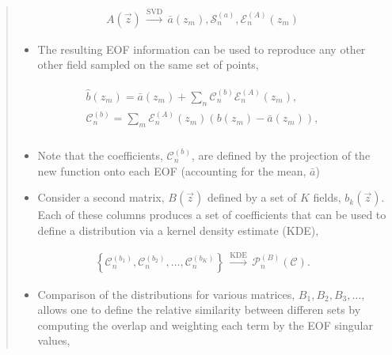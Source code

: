 \documentclass[letterpaper,10pt,english]{sphinxmanual}
\begin{document}
\begin{itemize}
\begin{quote}
\begin{itemize}
\end{itemize}
\begin{equation*}
\begin{split}A \left( \vec{z} \right)
\, \xrightarrow{\text{SVD}} \,
\bar{a} \left( z_m \right), \mathcal{S}_n^{(a)}, \mathcal{E}_n^{(A)} \left( z_m \right)\end{split}
\end{equation*}\begin{itemize}
\item {} 
\sphinxAtStartPar
The resulting EOF information can be used to reproduce any other other field sampled on the same set of points,

\end{itemize}
\begin{align*}\!\begin{aligned}
\hat{b} \left( z_m \right) = \bar{a} \left( z_m \right) + \sum_n{ \mathcal{C}_n^{(b)} \mathcal{E}_n^{(A)} \left( z_m \right)},\\
\mathcal{C}_n^{(b)} = \sum_m{\mathcal{E}_n^{(A)} \left( z_m \right) \left( b \left( z_m \right) - \bar{a} \left( z_m \right) \right)},\\
\end{aligned}\end{align*}\begin{itemize}
\item {} 
\sphinxAtStartPar
Note that the coefficients, \(\mathcal{C}_n^{(b)}\), are defined by the projection of the new function onto each EOF (accounting for the mean, \(\bar{a}\))

\item {} 
\sphinxAtStartPar
Consider a second matrix, \(B\left( \vec{z} \right)\) defined by a set of \(K\) fields, \(b_k \left( \vec{z} \right)\).  Each of these columns produces a set of coefficients that can be used to define a distribution via a kernel density estimate (KDE),

\end{itemize}
\begin{equation*}
\begin{split}\left\{ \mathcal{C}_n^{(b_1)},  \mathcal{C}_n^{(b_2)}, \ldots, \mathcal{C}_n^{(b_K)} \right\}
    \, \xrightarrow{\text{KDE}} \,
    \mathcal{P}_n^{(B)} \left( \mathcal{C} \right).\end{split}
\end{equation*}\begin{itemize}
\item {} 
\sphinxAtStartPar
Comparison of the distributions for various matrices, \(B_1, B_2, B_3, \ldots\), allows one to define the relative similarity between differen sets by computing the overlap and weighting each term by the EOF singular values,


\end{itemize}
\end{quote}
\end{itemize}
\end{document}
